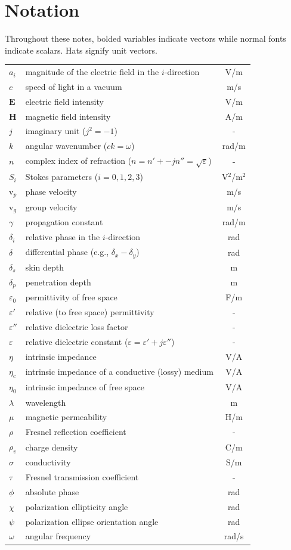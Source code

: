 \documentclass[11pt, oneside]{article}
\begin{document}
\section*{Notation}
Throughout these notes, bolded variables indicate vectors while normal fonts indicate scalars. Hats signify unit vectors. 
\begin{longtable}{l l c}
	$a_i$ & magnitude of the electric field in the $i$-direction & V/m \\
	$c$ & speed of light in a vacuum & m/s \\
	$\mathbf{E}$ & electric field intensity & V/m \\
	$\mathbf{H}$ & magnetic field intensity & A/m \\
	$j$ & imaginary unit ($j^2 = -1$) & - \\
	$k$ & angular wavenumber ($ck=\omega$) & rad/m \\
	$n$ & complex index of refraction ($n=n'+-jn''=\sqrt{\varepsilon}$) & - \\
	$S_i$ & Stokes parameters ($i=0,1,2,3$) & V$^2$/m$^2$ \\
	$\mathrm{v}_p$ & phase velocity & m/s \\
	$\mathrm{v}_g$ & group velocity & m/s \\
	$\gamma$ & propagation constant & rad/m \\
	$\delta_i$ & relative phase in the $i$-direction & rad \\
	$\delta$ & differential phase (e.g., $\delta_x - \delta_y$) & rad \\
	$\delta_s$ & skin depth & m\\
	$\delta_p$ & penetration depth & m \\
	$\varepsilon_0$ & permittivity of free space & F/m \\
	$ \varepsilon' $ & relative (to free space) permittivity & - \\
	$ \varepsilon'' $ & relative dielectric loss factor & - \\
	$ \varepsilon$ & relative dielectric constant ($\varepsilon = \varepsilon' + j\varepsilon''$) & - \\ 
	$\eta$ & intrinsic impedance & V/A \\
	$\eta_c$ & intrinsic impedance of a conductive (lossy) medium & V/A \\
	$\eta_0$ & intrinsic impedance of free space & V/A \\
	$\lambda$ & wavelength & m \\
	$\mu$ & magnetic permeability & H/m \\
	$\rho$ & Fresnel reflection coefficient & - \\
	$\rho_v$ & charge density & C/m \\
	$\sigma$ & conductivity & S/m \\
	$\tau$ & Fresnel transmission coefficient & - \\
	$\phi$ & absolute phase & rad \\
	$\chi$ & polarization ellipticity angle & rad \\
	$\psi$ & polarization ellipse orientation angle & rad \\
	$\omega$ & angular frequency & rad/s \\
\end{longtable}
\end{document}
